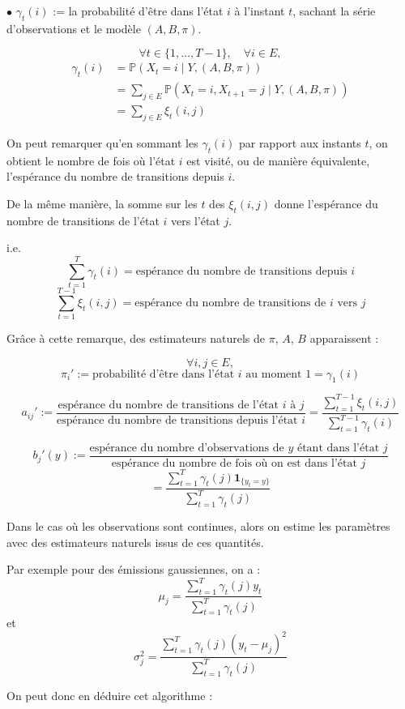 \documentclass[11pt]{article}
\begin{document}
\newpage
\textbf{$\bullet$} $\gamma_t(i)$ := la probabilité d'être dans l'état $i$ à l'instant $t$, sachant la série d'observations et le modèle $(A,B,\pi)$.

\[
\forall t \in \{1,\dots,T-1\}, \quad \forall i \in E,
\]
\begin{align*}
\gamma_t(i) 
&= \mathbb{P}(X_t=i \mid Y,(A,B,\pi)) \\
&= \sum_{j \in E}\mathbb{P}(X_t=i,X_{t+1}=j \mid Y,(A,B,\pi)) \\
&= \sum_{j \in E}\xi_t(i,j)
\end{align*}

On peut remarquer qu'en sommant les $\gamma_t(i)$ par rapport aux instants $t$, on obtient le nombre de fois où l'état $i$ est visité, ou de manière équivalente, l'espérance du nombre de transitions depuis $i$.

De la même manière, la somme sur les $t$ des $\xi_t(i,j)$ donne l'espérance du nombre de transitions de l'état $i$ vers l'état $j$.

i.e.
\[
\sum_{t=1}^{T}\gamma_t(i) = \text{espérance du nombre de transitions depuis } i
\]
\[
\sum_{t=1}^{T-1}\xi_t(i,j) = \text{espérance du nombre de transitions de } i \text{ vers } j
\]

Grâce à cette remarque, des estimateurs naturels de $\pi$, $A$, $B$ apparaissent :

\[
\forall i,j \in E,
\]
\[
\pi_i' := \text{probabilité d'être dans l'état } i \text{ au moment } 1
=\gamma_1(i)
\]

\[
a_{ij}' :=
\frac{\text{espérance du nombre de transitions de l'état } i \text{ à } j}
{\text{espérance du nombre de transitions depuis l'état } i}
=
\frac{\sum_{t=1}^{T-1}\xi_t(i,j)}
{\sum_{t=1}^{T-1}\gamma_t(i)}
\]

\[
b_j'(y) :=
\frac{\text{espérance du nombre d'observations de } y \text{ étant dans l'état } j}
{\text{espérance du nombre de fois où on est dans l'état } j}
\]
\[
=
\frac{\sum_{t=1}^{T}\gamma_t(j)\mathbf{1}_{\{y_t=y\}}}
{\sum_{t=1}^{T}\gamma_t(j)}
\]

Dans le cas où les observations sont continues, alors on estime les paramètres avec des estimateurs naturels issus de ces quantités.

Par exemple pour des émissions gaussiennes, on a :
\[
\mu_j =
\frac{\sum_{t=1}^{T}\gamma_t(j)y_t}
{\sum_{t=1}^{T}\gamma_t(j)}
\]
et
\[
\sigma_j^2 =
\frac{\sum_{t=1}^{T}\gamma_t(j)(y_t-\mu_j)^2}
{\sum_{t=1}^{T}\gamma_t(j)}
\]

On peut donc en déduire cet algorithme :
\end{document}
